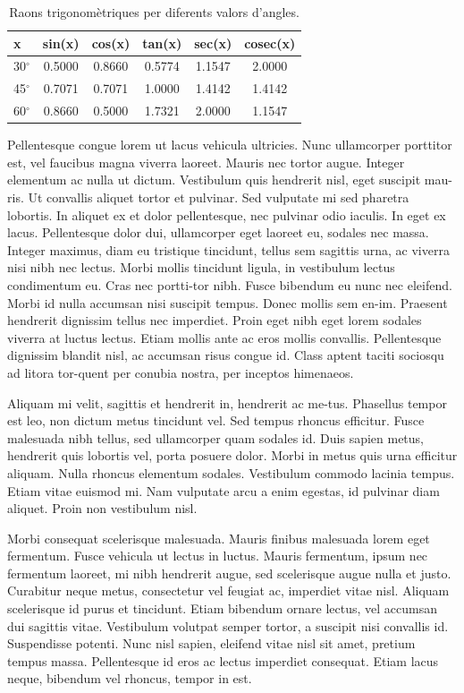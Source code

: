 ﻿\documentclass[10pt,a4paper,twocolumn,twoside]{article}
\begin{document}
\begin{table}[!h]
\centering
\begin{tabular}{lccccc}
 x & sin(x) &	cos(x)& tan(x) &  sec(x) & cosec(x)\\
\hline
30$^\circ$ & 0.5000 & 0.8660 & 0.5774 & 1.1547 & 2.0000\\
45$^\circ$ & 0.7071 & 0.7071 & 1.0000 & 1.4142 & 1.4142\\
60$^\circ$ & 0.8660 & 0.5000 & 1.7321 & 2.0000 & 1.1547\\
\hline
\end{tabular}
\caption{ Raons trigonomètriques per diferents valors d’angles.}
\label{t:raonstrigonometriques}
\end{table}

Pellentesque congue lorem ut lacus vehicula ultricies. Nunc ullamcorper porttitor est, vel faucibus magna viverra laoreet. Mauris nec tortor augue. Integer elementum ac nulla ut dictum. Vestibulum quis hendrerit nisl, eget suscipit mau-ris. Ut convallis aliquet tortor et pulvinar. Sed vulputate mi sed pharetra lobortis. In aliquet ex et dolor pellentesque, nec pulvinar odio iaculis. In eget ex lacus. Pellentesque dolor dui, ullamcorper eget laoreet eu, sodales nec massa. Integer maximus, diam eu tristique tincidunt, tellus sem sagittis urna, ac viverra nisi nibh nec lectus. Morbi mollis tincidunt ligula, in vestibulum lectus condimentum eu. Cras nec portti-tor nibh. Fusce bibendum eu nunc nec eleifend. Morbi id nulla accumsan nisi suscipit tempus. Donec mollis sem en-im. Praesent hendrerit dignissim tellus nec imperdiet. Proin eget nibh eget lorem sodales viverra at luctus lectus. Etiam mollis ante ac eros mollis convallis. Pellentesque dignissim blandit nisl, ac accumsan risus congue id. Class aptent taciti sociosqu ad litora tor-quent per conubia nostra, per inceptos himenaeos. 

Aliquam mi velit, sagittis et hendrerit in, hendrerit ac me-tus. Phasellus tempor est leo, non dictum metus tincidunt vel. Sed tempus rhoncus efficitur. Fusce malesuada nibh tellus, sed ullamcorper quam sodales id. Duis sapien metus, hendrerit quis lobortis vel, porta posuere dolor. Morbi in metus quis urna efficitur aliquam. Nulla rhoncus elementum sodales. Vestibulum commodo lacinia tempus. Etiam vitae euismod mi. Nam vulputate arcu a enim egestas, id pulvinar diam aliquet. Proin non vestibulum nisl.

Morbi consequat scelerisque malesuada. Mauris finibus malesuada lorem eget fermentum. Fusce vehicula ut lectus in luctus. Mauris fermentum, ipsum nec fermentum laoreet, mi nibh hendrerit augue, sed scelerisque augue nulla et justo. Curabitur neque metus, consectetur vel feugiat ac, imperdiet vitae nisl. Aliquam scelerisque id purus et tincidunt. Etiam bibendum ornare lectus, vel accumsan dui sagittis vitae. Vestibulum volutpat semper tortor, a suscipit nisi convallis id. Suspendisse potenti. Nunc nisl sapien, eleifend vitae nisl sit amet, pretium tempus massa. Pellentesque id eros ac lectus imperdiet consequat. Etiam lacus neque, bibendum vel rhoncus, tempor in est. 
\end{document}
